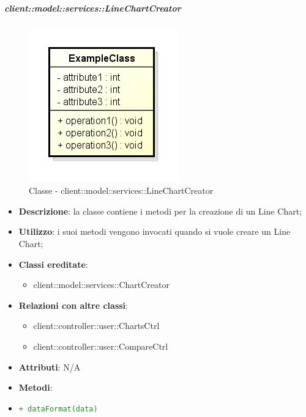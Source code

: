 		\subparagraph{client::model::services::LineChartCreator} %
		\label{subp:linechartcreator}
			\begin{figure}[htbp]
				\centering
				\centerline{\includegraphics[scale=0.7]{./images/client/classes/example_class.png}}
				\caption{Classe - client::model::services::LineChartCreator}
			\end{figure}
			\begin{itemize}
				\item \textbf{Descrizione}: la classe contiene i metodi per la creazione di un Line Chart;
				\item \textbf{Utilizzo}: i suoi metodi vengono invocati quando si vuole creare un Line Chart;
				\item \textbf{Classi ereditate}:
					\begin{itemize}
						\item client::model::services::ChartCreator
					\end{itemize}
				\item \textbf{Relazioni con altre classi}:
					\begin{itemize}
						\item client::controller::user::ChartsCtrl
						\item client::controller::user::CompareCtrl
					\end{itemize}
				\item \textbf{Attributi}: N/A
				\item \textbf{Metodi}: 
					\item \textcolor{forestgreen}{\texttt{+ dataFormat(data)}}
			\end{itemize}


